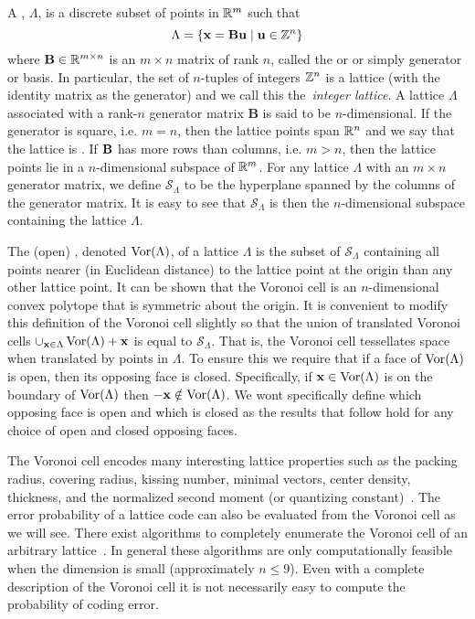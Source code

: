 \documentclass[draftcls, onecolumn, 11pt]{IEEEtran}
\begin{document}
A , $\Lambda$, is a discrete subset of points in ${\mathbb R}^m$ such that
\[
   \Lambda = \{\mathbf{x} = \mathbf{B}\mathbf{u} \mid \mathbf{u} \in {\mathbb Z}^n \}
 \]
 where $\mathbf{B} \in {\mathbb R}^{m \times n}$ is an $m \times n$ matrix of rank $n$, called the  or  or simply generator or basis. In particular, the set of $n$-tuples of integers ${\mathbb Z}^n$ is a lattice (with the identity matrix as the generator) and we call this the~\emph{integer lattice}. A lattice $\Lambda$ associated with a rank-$n$ generator matrix $\mathbf{B}$ is said to be $n$-dimensional. If the generator is square, i.e. $m = n$, then the lattice points span ${\mathbb R}^n$ and we say that the lattice is . If $\mathbf{B}$ has more rows than columns, i.e. $m > n$, then the lattice points lie in a $n$-dimensional subspace of ${\mathbb R}^m$. For any lattice $\Lambda$ with an $m \times n$ generator matrix, we define $\mathcal{S}_{\Lambda}$ to be the hyperplane spanned by the columns of the generator matrix. It is easy to see that $\mathcal{S}_\Lambda$ is then the $n$-dimensional subspace containing the lattice $\Lambda$.

The (open) , denoted $\operatorname{Vor}(\Lambda)$, of a lattice $\Lambda$ is the subset of $\mathcal{S}_{\Lambda}$ containing all points nearer (in Euclidean distance) to the lattice point at the origin than any other lattice point. It can be shown that the Voronoi cell is an $n$-dimensional convex polytope that is symmetric about the origin.  It is convenient to modify this definition of the Voronoi cell slightly so that the union of translated Voronoi cells $\cup_{\mathbf{x} \in \Lambda}\operatorname{Vor}(\Lambda) + \mathbf{x}$ is equal to  $\mathcal{S}_{\Lambda}$.  That is, the Voronoi cell tessellates space when translated by points in $\Lambda$.  To ensure this we require that if a face of $\operatorname{Vor}(\Lambda)$ is open, then its opposing face is closed. Specifically, if $\mathbf{x} \in \operatorname{Vor}(\Lambda)$ is on the boundary of $\operatorname{Vor}(\Lambda)$ then $-\mathbf{x} \notin \operatorname{Vor}(\Lambda)$.  We wont specifically define which opposing face is open and which is closed as the results that follow hold for any choice of open and closed opposing faces.

The Voronoi cell encodes many interesting lattice properties such as the packing radius, covering radius, kissing number, minimal vectors, center density, thickness, and the normalized second moment (or quantizing constant)~\cite{Viterbo_diamond_cutting_1996, SPLAG}. The error probability of a lattice code can also be evaluated from the Voronoi cell as we will see.  There exist algorithms to completely enumerate the Voronoi cell of an arbitrary lattice~\cite{Viterbo_diamond_cutting_1996,Sikiric_complex_algs_vor_cells_2009,Sikiric_vor_reduction_covering_2008,Valentin2003_coverings_tilings_low_dimension}.  In general these algorithms are only computationally feasible when the dimension is small (approximately $n \leq 9$).  Even with a complete description of the Voronoi cell it is not necessarily easy to compute the probability of coding error.
\end{document}
